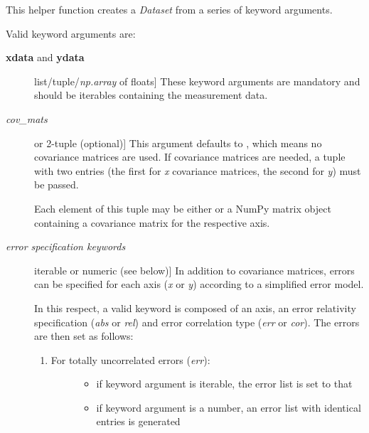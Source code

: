 \documentclass[a4paper,10pt,english]{sphinxmanual}
\begin{document}
\begin{fulllineitems}
\label{index:kafe.dataset.build_dataset}
This helper function creates a \emph{Dataset} from a series of keyword
arguments.

Valid keyword arguments are:
\begin{description}
\item[{\textbf{xdata} and \textbf{ydata}}] \leavevmode{[}list/tuple/\emph{np.array} of floats{]}
These keyword arguments are mandatory and should be iterables
containing the measurement data.

\item[{\emph{cov\_mats}}] \leavevmode{[} or 2-tuple (optional){]}
This argument defaults to , which means no covariance matrices
are used. If covariance matrices are needed, a tuple with two entries
(the first for \emph{x} covariance matrices, the second for \emph{y}) must be
passed.

Each element of this tuple may be either  or a NumPy matrix
object containing a covariance matrix for the respective axis.

\item[{\emph{error specification keywords}}] \leavevmode{[}iterable or numeric (see below){]}
In addition to covariance matrices, errors can be specified for each
axis (\emph{x} or \emph{y}) according to a simplified error model.

In this respect, a valid keyword is composed of an axis, an error
relativity specification (\emph{abs} or \emph{rel}) and error correlation type
(\emph{err} or \emph{cor}). The errors are then set as follows:
\begin{enumerate}
\item {} \begin{description}
\item[{For totally uncorrelated errors (\emph{err}):}] \leavevmode\begin{itemize}
\item {} 
if keyword argument is iterable, the error list is set to that

\item {} 
if keyword argument is a number, an error list with identical entries is generated


\end{itemize}
\end{description}
\end{enumerate}
\end{description}
\end{fulllineitems}
\end{document}
